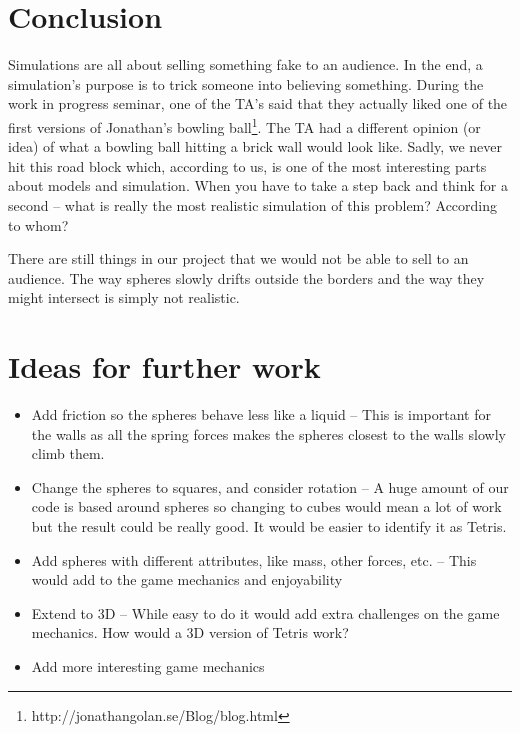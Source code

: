 \documentclass[11pt]{article} %
\begin{document}
\section{Conclusion}
Simulations are all about selling something fake to an audience. In the end, a simulation's purpose is to trick someone into believing something. During the work in progress seminar, one of the TA's said that they actually liked one of the first versions of Jonathan's bowling ball\footnote{http://jonathangolan.se/Blog/blog.html}. The TA had a different opinion (or idea) of what a bowling ball hitting a brick wall would look like. Sadly, we never hit this road block which, according to us, is one of the most interesting parts about models and simulation. When you have to take a step back and think for a second -- what is really the most realistic simulation of this problem? According to whom?

There are still things in our project that we would not be able to sell to an audience. The way spheres slowly drifts outside the borders and the way they might intersect is simply not realistic. 

\section{Ideas for further work}
\begin{itemize}
\item{Add friction so the spheres behave less like a liquid -- This is important for the walls as all the spring forces makes the spheres closest to the walls slowly climb them.}
\item{Change the spheres to squares, and consider rotation -- A huge amount of our code is based around spheres so changing to cubes would mean a lot of work but the result could be really good. It would be easier to identify it as Tetris.}
\item{Add spheres with different attributes, like mass, other forces, etc. -- This would add to the game mechanics and enjoyability}
\item{Extend to 3D -- While easy to do it would add extra challenges on the game mechanics. How would a 3D version of Tetris work?}
\item{Add more interesting game mechanics}
\end{itemize}
\end{document}
